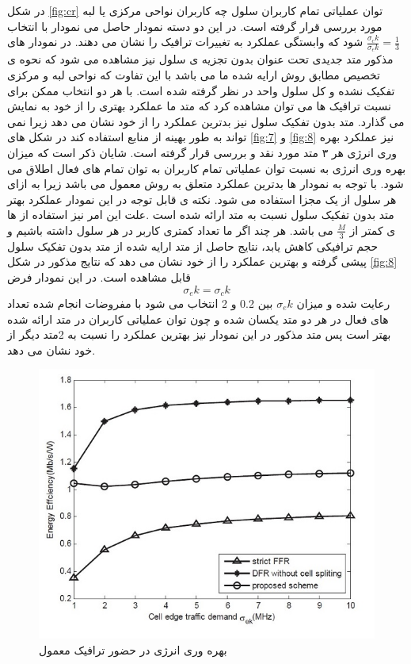 در شکل \eqref{fig:cr}  توان عملیاتی تمام کاربران سلول چه کاربران
نواحی مرکزی یا لبه مورد بررسی قرار گرفته است. در این
 دو دسته نمودار حاصل می
نمودار با انتخاب  $\frac{\sigma_ck}{\sigma_ek} = \frac{1}{3}$ 
شود که وابستگی عملکرد به تغییرات ترافیک را نشان می
دهند. در نمودار های مذکور متد جدیدی تحت عنوان  بدون تجزیه ی سلول نیز مشاهده می شود که نحوه
ی تخصیص مطابق روش ارایه شده ما می باشد با این
تفاوت که نواحی لبه و مرکزی تفکیک نشده و کل سلول
واحد در نظر گرفته شده است. با هر دو انتخاب ممکن برای
نسبت ترافیک ها می توان مشاهده کرد که متد ما عملکرد
بهتری را از خود به نمایش می گذارد. متد    بدون
تفکیک سلول نیز بدترین عملکرد را از خود نشان می دهد
زیرا نمی تواند به طور بهینه از منابع استفاده کند
در شکل های \eqref{fig:7} و \eqref{fig:8} نیز عملکرد بهره وری انرژی هر ۳
متد مورد نقد و بررسی قرار گرفته است. شایان ذکر است
که میزان بهره وری انرژی به نسبت توان عملیاتی تمام
کاربران به توان تمام  های فعال اطلاق می شود. با
توجه به نمودار ها بدترین عملکرد متعلق به روش 
معمول می باشد زیرا به ازای هر سلول از یک  مجزا
استفاده می شود.
نکته ی قابل توجه در این نمودار عملکرد
بهتر متد  بدون تفکیک سلول نسبت به متد ارائه شده
است .علت این امر نیز استفاده از  ها ی کمتر از
$\frac{M}{3}$
می باشد. هر چند اگر ما تعداد کمتری کاربر در هر سلول داشته
باشیم و حجم ترافیکی کاهش یابد، نتایج حاصل از متد ارایه
شده از متد  بدون تفکیک سلول پیشی گرفته و بهترین
عملکرد را از خود نشان می دهد که نتایج مذکور در شکل
  \eqref{fig:8}
   قابل مشاهده است. در این نمودار فرض
\begin{equation*}
\sigma_e k = \sigma_c k
\end{equation*}  
 رعایت شده و میزان $\sigma_ek$ بین  0.2 و 2 انتخاب می شود
با مفروضات انجام شده تعداد  های فعال در هر دو
متد یکسان شده و چون توان عملیاتی کاربران در متد ارائه
شده بهتر است پس متد مذکور در این نمودار نیز بهترین
عملکرد را نسبت به  2متد دیگر از خود نشان می دهد.  
\begin{figure}
  \centering
    \includegraphics[scale=0.7]{./pic1/7}
  \caption{ بهره وری انرژی در حضور ترافیک معمول \cite{graph}  }
  \label{fig:7}
\end{figure}

